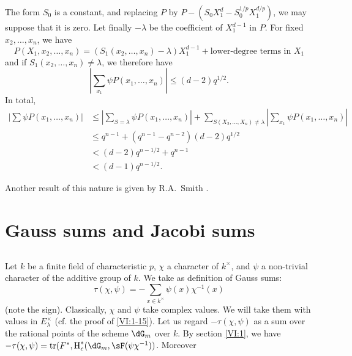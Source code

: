 The form $S_0$ is a constant, and replacing $P$ by
$P-(S_0 X_1^d -S_0^{1/p} X_1^{d/p})$, we may suppose that it is zero. Let
finally $-\lambda$ be the coefficient of $X_1^{d-1}$ in $P$. For fixed
$x_2,\dots,x_n$, we have 
\[
  P(X_1,x_2,\dots,x_n) = (S_1(x_2,\dots,x_n)-\lambda) X_1^{d-1} + \text{lower-degree terms in $X_1$}
\]
and if $S_1(x_2,\dots,x_n)\ne \lambda$, we therefore have 
\[
  \left| \sum_{x_1} \psi P(x_1,\dots,x_n)\right| \leqslant (d-2) q^{1/2} \text{.} 
\]
In total, 
\begin{align*}
  \left|\sum \psi P(x_1,\dots,x_n)\right| 
    &\leqslant \left|\sum_{S=\lambda} \psi P(x_1,\dots,x_n)\right| + \sum_{S(X_2,\dots,X_n)\ne\lambda} \left| \sum_{x_1} \psi P(x_1,\dots,x_n)\right| \\
    &\leqslant q^{n-1} + (q^{n-1}-q^{n-2})(d-2) q^{1/2} \\
    &< (d-2) q^{n-1/2} + q^{n-1} \\
    &< (d-1) q^{n-1/2} \text{.}
\end{align*}

Another result of this nature is given by R.A.\ Smith
\cite{sm70}. 










\section{Gauss sums and Jacobi sums}\label{VI:4}





\subsection{}\label{VI:4-1}

Let $k$ be a finite field of characteristic $p$, $\chi$ a character of
$k^\times$, and $\psi$ a non-trivial character of the additive group of $k$. We
take as definition of Gauss sums: 
\begin{equation*}\tag{4.1.1}\label{VI:eq:4-1-1}
  \tau(\chi,\psi) = -\sum_{x\in k^\times} \psi(x) \chi^{-1}(x) 
\end{equation*}
(note the sign). Classically, $\chi$ and $\psi$ take complex values.
We will take them with values in $E_\lambda^\times$ (cf. the proof of
\ref{VI:1-15}). Let us regard $-\tau(\chi,\psi)$ as a sum over the
rational points of the scheme $\dG_m$ over $k$. By section \ref{VI:1},
we have $-\tau(\chi,\psi) = \tr(F^\ast,\h_c^\ast(\dG_m,\sF(\psi \chi^{-1}))$. Moreover 





